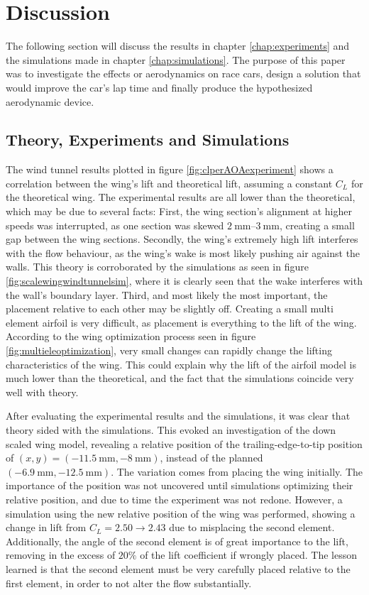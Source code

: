 \chapter{Discussion}
  The following section will discuss the results in chapter \ref{chap:experiments} and the simulations made in chapter \ref{chap:simulations}. The purpose of this paper was to investigate the effects or aerodynamics on race cars, design a solution that would improve the car's lap time and finally produce the hypothesized aerodynamic device.

  \section{Theory, Experiments and Simulations}

  The wind tunnel results plotted in figure \ref{fig:clperAOAexperiment} shows a correlation between the wing's lift and theoretical lift, assuming a constant $C_L$ for the theoretical wing. The experimental results are all lower than the theoretical, which may be due to several facts: First, the wing section's alignment at higher speeds was interrupted, as one section was skewed $\SIrange{2}{3}{\milli\metre}$, creating a small gap between the wing sections. Secondly, the wing's extremely high lift interferes with the flow behaviour, as the wing's wake is most likely pushing air against the walls. This theory is corroborated by the simulations as seen in figure \ref{fig:scalewingwindtunnelsim}, where it is clearly seen that the wake interferes with the wall's boundary layer. Third, and most likely the most important, the placement relative to each other may be slightly off. Creating a small multi element airfoil is very difficult, as placement is everything to the lift of the wing. According to the wing optimization process seen in figure \ref{fig:multieleoptimization}, very small changes can rapidly change the  lifting characteristics of the wing. This could explain why the lift of the airfoil model is much lower than the theoretical, and the fact that the simulations coincide very well with theory.

  After evaluating the experimental results and the simulations, it was clear that theory sided with the simulations. This evoked an investigation of the down scaled wing model, revealing a relative position of the trailing-edge-to-tip position of $(x,y) = (\SI{-11.5}{\milli\metre},\SI{-8}{\milli\metre})$, instead of the planned $(\SI{-6.9}{\milli\metre},\SI{-12.5}{\milli\metre})$. The variation comes from placing the wing initially. The importance of the position was not uncovered until simulations optimizing their relative position, and due to time the experiment was not redone. However, a simulation using the new relative position of the wing was performed, showing a change in lift from $ C_L = 2.50 \rightarrow 2.43$ due to misplacing the second element. Additionally, the angle of the second element is of great importance to the lift, removing in the excess of $20\%$ of the lift coefficient if wrongly placed. The lesson learned is that the second element must be very carefully placed relative to the first element, in order to not alter the flow substantially.

